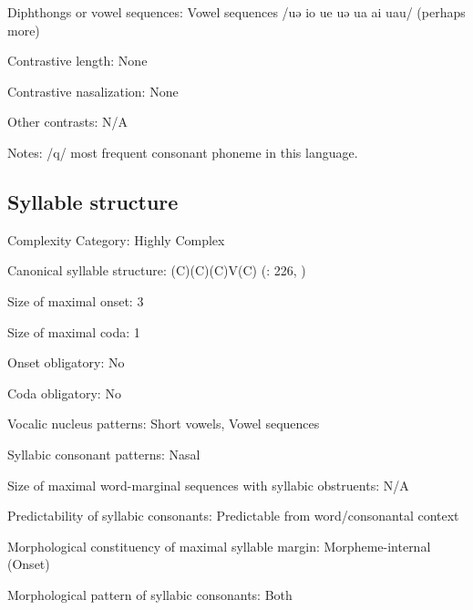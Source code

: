 {\begin{appendixdesc}
\item[Diphthongs or vowel sequences:] Vowel sequences /uə io ue uə ua ai uau/ (perhaps more)

\item[Contrastive length:] None

\item[Contrastive nasalization:] None

\item[Other contrasts:] N/A

\item[Notes:] /q/ most frequent consonant phoneme in this language.
\end{appendixdesc}
\subsection*{Syllable structure}
\begin{appendixdesc}

\item[Complexity Category:] Highly Complex

\item[Canonical syllable structure:] (C)(C)(C)V(C) (\citealt{Whitehead2004}: 226, \citealt{Whitehead1992})

\item[Size of maximal onset:] 3

\item[Size of maximal coda:] 1

\item[Onset obligatory:] No

\item[Coda obligatory:] No

\item[Vocalic nucleus patterns:] Short vowels, Vowel sequences

\item[Syllabic consonant patterns:] Nasal

\item[Size of maximal word-marginal sequences with syllabic obstruents:] N/A

\item[Predictability of syllabic consonants:] Predictable from word/consonantal context

\item[Morphological constituency of maximal syllable margin:] Morpheme-internal (Onset)

\item[Morphological pattern of syllabic consonants:] Both


\end{appendixdesc}}
